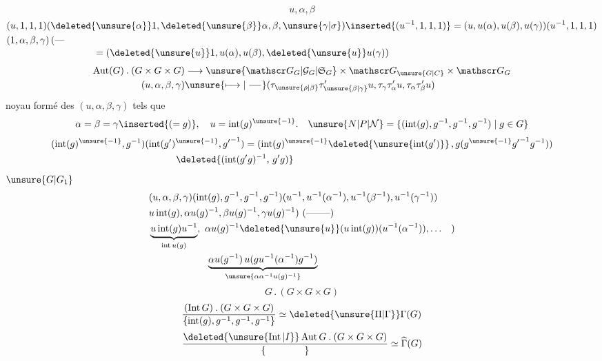 \[
 u,\alpha,\beta
\]
\[
\begin{aligned}
 &(u,1,1,1)(\deleted{\unsure{\alpha}}1,\deleted{\unsure{\beta}}\alpha,\beta,\unsure{\gamma|\sigma})\inserted{(u^{-1},1,1,1)}
 =(u,u(\alpha),u(\beta),u(\gamma))(u^{-1},1,1,1)\\
 &(1,\alpha,\beta,\gamma)\,(\text{---}\\[-2pt]
 &\hspace{9em}=(\deleted{\unsure{u}}1,u(\alpha),u(\beta),\deleted{\unsure{u}}u(\gamma))
\end{aligned}
\]
\[
\begin{aligned}
 \operatorname{Aut}(G)\mathbin{.}(G\times G\times G)&\longrightarrow
 \unsure{\mathscr G_G|\mathcal G_G|\mathfrak S_G}\times\mathscr G_{\unsure{G|C}}\times\mathscr G_G\\
 (u,\alpha,\beta,\gamma)&\unsure{\longmapsto|\relbar\joinrel\relbar}(\tau_{\unsure{\rho|\beta}}\tau'_{\unsure{\beta|\gamma}}u,\tau_\gamma\tau'_\alpha u,\tau_\alpha\tau'_\beta u)
\end{aligned}
\]
noyau formé des \((u,\alpha,\beta,\gamma)\) tels que
\[
 \alpha=\beta=\gamma\inserted{(=g)},\quad u=\operatorname{int}(g)^{\unsure{-1}}.
 \quad \unsure{N|P|\mathcal N}=\{(\operatorname{int}(g),g^{-1},g^{-1},g^{-1})\mid g\in G\}
\]
\[
\begin{aligned}
 &(\operatorname{int}(g)^{\unsure{-1}},g^{-1})(\operatorname{int}(g')^{\unsure{-1}},{g'}^{-1})
 =(\operatorname{int}(g)^{\unsure{-1}}\deleted{\unsure{\operatorname{int}(g')}}\,,
 g(g^{\unsure{-1}}{g'}^{-1}g^{-1}))\\
 &\hspace{13em}\deleted{(\operatorname{int}(g'g)^{-1},\,g'g)}
\end{aligned}
\]
\(\unsure{G|G_1}\)
\[
\begin{aligned}
 &(u,\alpha,\beta,\gamma)(\operatorname{int}(g),g^{-1},g^{-1},g^{-1})
 (u^{-1},u^{-1}(\alpha^{-1}),u^{-1}(\beta^{-1}),u^{-1}(\gamma^{-1}))\\
 &u\operatorname{int}(g),\alpha u(g)^{-1},\beta u(g)^{-1},\gamma u(g)^{-1})\ (\text{--------})\\
 &\underbrace{u\operatorname{int}(g)u^{-1}}_{\operatorname{int}u(g)},\
 \alpha u(g)^{-1}\deleted{\unsure{u}}(u\operatorname{int}(g))(u^{-1}(\alpha^{-1})),\ldots\quad)\\
 &\hspace{6em}\underbrace{\alpha u(g^{-1})\,u(gu^{-1}(\alpha^{-1})g^{-1})}_{\unsure{\alpha\alpha^{-1}u(g)^{-1}}}
\end{aligned}
\]
\[
 G\mathbin{.}(G\times G\times G)
\]
\[
 \frac{(\operatorname{Int}G)\mathbin{.}(G\times G\times G)}
 {\{\operatorname{int}(g),g^{-1},g^{-1},g^{-1}\}}
 \simeq\deleted{\unsure{\Pi|\Gamma}}\Gamma(G)
\]
\[
 \frac{\deleted{\unsure{\operatorname{Int}|I}}\operatorname{Aut}G\mathbin{.}(G\times G\times G)}
 {\{\hspace{4em}\}}\simeq\widehat \Gamma(G)
\]
